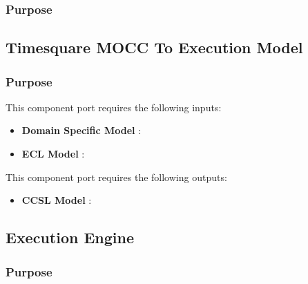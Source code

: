 \documentclass{gemoc} %
\begin{document}
\subsubsection{Purpose}



\subsection{Timesquare MOCC To Execution Model}


\subsubsection{Purpose}

This component port requires the following inputs:
\begin{itemize}
  \item \textbf{Domain Specific Model} :
  \item \textbf{ECL Model} :

\end{itemize} 


This component port requires the following outputs:
\begin{itemize}
  \item \textbf{CCSL Model} :
\end{itemize}

\subsection{Execution Engine}


\subsubsection{Purpose}
\end{document}
